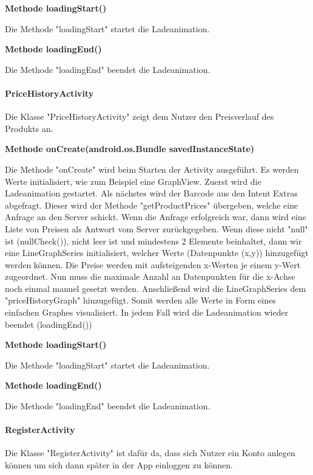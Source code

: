 \documentclass{scrartcl}
\begin{document}
\noindent\textbf{Methode loadingStart()}

\noindent Die Methode "loadingStart" startet die Ladeanimation. \newline

\noindent\textbf{Methode loadingEnd()}

\noindent Die Methode "loadingEnd" beendet die Ladeanimation. \newline

\paragraph{PriceHistoryActivity}
Die Klasse "PriceHistoryActivity" zeigt dem Nutzer den Preisverlauf des Produkts an. \newline 

\noindent\textbf{Methode onCreate(android.os.Bundle savedInstanceState)}

\noindent Die Methode "onCreate" wird beim Starten der Activity ausgeführt. Es werden Werte initialisiert, wie zum Beispiel eine GraphView. Zuerst wird die Ladeanimation gestartet. Als nächstes wird der Barcode aus den Intent Extras abgefragt. Dieser wird der Methode "getProductPrices" übergeben, welche eine Anfrage an den Server schickt. Wenn die Anfrage erfolgreich war, dann wird eine Liste von Preisen als Antwort vom Server zurückgegeben. Wenn diese nicht "null" ist (nullCheck()), nicht leer ist und mindestens 2 Elemente beinhaltet, dann wir eine LineGraphSeries initialisiert, welcher Werte (Datenpunkte (x,y)) hinzugefügt werden können. Die Preise werden mit aufsteigenden x-Werten je einem y-Wert zugeordnet. Nun muss die maximale Anzahl an Datenpunkten für die x-Achse noch einmal manuel gesetzt werden. Anschließend wird die LineGraphSeries dem "priceHistoryGraph" hinzugefügt. Somit werden alle Werte in Form eines einfachen Graphes visualisiert. In jedem Fall wird die Ladeanimation wieder beendet (loadingEnd()) \newline

\noindent\textbf{Methode loadingStart()}

\noindent Die Methode "loadingStart" startet die Ladeanimation. \newline

\noindent\textbf{Methode loadingEnd()}

\noindent Die Methode "loadingEnd" beendet die Ladeanimation. \newline

\paragraph{RegisterActivity}
Die Klasse "RegisterActivity" ist dafür da, dass sich Nutzer ein Konto anlegen können um sich dann später in der App einloggen zu können. \newline 
\end{document}
